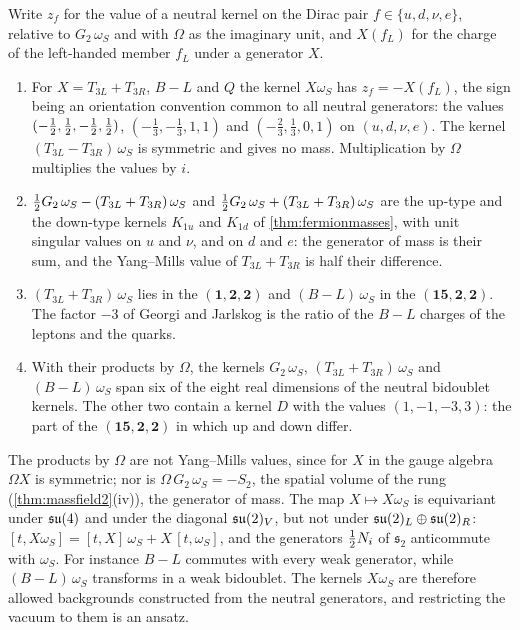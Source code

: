 \begin{proposition}
\label{prop:ymvalues}
Write $z_f$ for the value of a neutral kernel on the Dirac pair $f\in\{u,d,\nu,e\}$, relative to $G_2\,\omega_S$ and with $\Omega$ as the
imaginary unit, and $X(f_L)$ for the charge of the left-handed member $f_L$ under a generator $X$.
\begin{enumerate}[label=(\roman*),leftmargin=2.2em,itemsep=1pt]
\item For $X=T_{3L}+T_{3R}$, $B\!-\!L$ and $Q$ the kernel $X\omega_S$ has $z_f=-X(f_L)$, the sign being an orientation convention common to
all neutral generators: the values $(-\tfrac12,\tfrac12,-\tfrac12,\tfrac12)$, $(-\tfrac13,-\tfrac13,1,1)$ and $(-\tfrac23,\tfrac13,0,1)$ on
$(u,d,\nu,e)$. The kernel $(T_{3L}-T_{3R})\,\omega_S$ is symmetric and gives no mass. Multiplication by $\Omega$ multiplies the values by $i$.
\item $\tfrac12 G_2\,\omega_S-(T_{3L}+T_{3R})\,\omega_S$ and $\tfrac12 G_2\,\omega_S+(T_{3L}+T_{3R})\,\omega_S$ are the up-type and the down-type
kernels $K_{1u}$ and $K_{1d}$ of \cref{thm:fermionmasses}, with unit singular values on $u$ and $\nu$, and on $d$ and $e$: the generator of
mass is their sum, and the Yang--Mills value of $T_{3L}+T_{3R}$ is half their difference.
\item $(T_{3L}+T_{3R})\,\omega_S$ lies in the $(\mathbf1,\mathbf2,\mathbf2)$ and $(B\!-\!L)\,\omega_S$ in the $(\mathbf{15},\mathbf2,\mathbf2)$. The
factor $-3$ of Georgi and Jarlskog is the ratio of the $B\!-\!L$ charges of the leptons and the quarks.
\item With their products by $\Omega$, the kernels $G_2\,\omega_S$, $(T_{3L}+T_{3R})\,\omega_S$ and $(B\!-\!L)\,\omega_S$ span six of the
eight real dimensions of the neutral bidoublet kernels. The other two contain a kernel $D$ with the values $(1,-1,-3,3)$: the part of the
$(\mathbf{15},\mathbf2,\mathbf2)$ in which up and down differ.
\end{enumerate}
\end{proposition}

The products by $\Omega$ are not Yang--Mills values, since for $X$ in the gauge algebra $\Omega X$ is symmetric; nor is
$\Omega\,G_2\,\omega_S=-S_2$, the spatial volume of the rung (\cref{thm:massfield2}(iv)), the generator of mass. The map $X\mapsto X\omega_S$
is equivariant under $\mathfrak{su}(4)$ and under the diagonal $\mathfrak{su}(2)_V$, but not under $\mathfrak{su}(2)_L\oplus\mathfrak{su}(2)_R$: $[t,X\omega_S]=[t,X]\,\omega_S+X\,[t,\omega_S]$,
and the generators $\tfrac12 N_i$ of $\mathfrak s_2$ anticommute with $\omega_S$. For instance $B\!-\!L$ commutes with every weak generator,
while $(B\!-\!L)\,\omega_S$ transforms in a weak bidoublet. The kernels $X\omega_S$ are therefore allowed backgrounds constructed from the
neutral generators, and restricting the vacuum to them is an ansatz.

